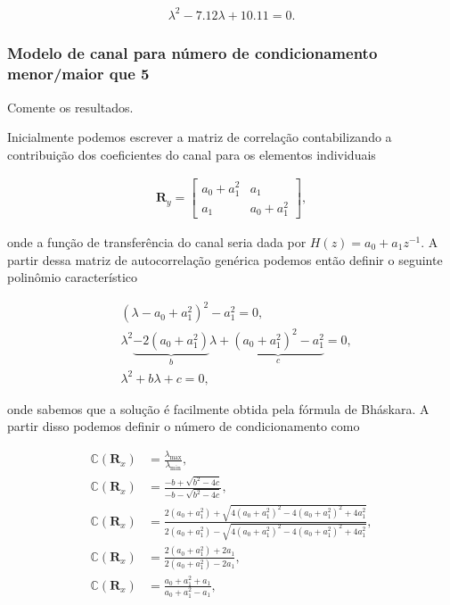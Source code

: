         \begin{align}
            \lambda^{2} - 7.12 \lambda + 10.11 = 0. 
        \end{align}


\subsubsection{Modelo de canal para número de condicionamento menor/maior que 5}
Comente os resultados.

Inicialmente podemos escrever a matriz de correlação contabilizando a contribuição dos coeficientes do canal para os elementos individuais

\begin{align}
    \mathbf{R}_{y} =
    \begin{bmatrix}
        a_{0} + a^{2}_{1} & a_{1}\\
        a_{1} & a_{0} + a^{2}_{1}
    \end{bmatrix},
\end{align}

onde a função de transferência do canal seria dada por $H(z) = a_{0} + a_{1}z^{-1}$. A partir dessa matriz de autocorrelação genérica podemos então 
definir o seguinte polinômio característico

\begin{align}
    &(\lambda - a_{0} + a^{2}_{1})^{2} - a^{2}_{1} = 0, \\
    &\lambda^{2} \underbrace{- 2 (a_{0} + a^{2}_{1})}_{b} \lambda + \underbrace{(a_{0} + a^{2}_{1})^{2} - a^{2}_{1}}_{c} = 0, \\
    &\lambda^{2} + b \lambda + c = 0,
\end{align}

onde sabemos que a solução é facilmente obtida pela fórmula de Bháskara. A partir disso podemos definir o número de condicionamento como

\begin{align}
    \mathbb{C} (\mathbf{R}_{x}) &= \frac{\lambda_{\text{max}}}{\lambda_{\text{min}}}, \\
    \mathbb{C} (\mathbf{R}_{x}) &= \frac{- b + \sqrt{b^{2} - 4c}}{- b - \sqrt{b^{2} - 4c}}, \\
    \mathbb{C} (\mathbf{R}_{x}) &= \frac{2 (a_{0} + a^{2}_{1}) + \sqrt{4 (a_{0} + a^{2}_{1})^{2} - 4 (a_{0} + a^{2}_{1})^{2} + 4 a^{2}_{1}}}{2 (a_{0} + a^{2}_{1}) - \sqrt{4 (a_{0} + a^{2}_{1})^{2} - 4 (a_{0} + a^{2}_{1})^{2} + 4 a^{2}_{1}}}, \\
    \mathbb{C} (\mathbf{R}_{x}) &= \frac{2 (a_{0} + a^{2}_{1}) + 2a_{1}}{2 (a_{0} + a^{2}_{1}) - 2a_{1}}, \\
    \mathbb{C} (\mathbf{R}_{x}) &= \frac{a_{0} + a^{2}_{1} + a_{1}}{a_{0} + a^{2}_{1} - a_{1}},
\end{align}

